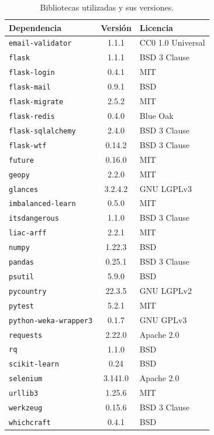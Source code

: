 \begin{table}[]
\centering
\begin{tabular}{lcl}
	\toprule
	\textbf{Dependencia} & \textbf{Versión} & \textbf{Licencia}\\
	\midrule
	\rowcolor[HTML]{EFEFEF} 
	\texttt{email-validator} & 1.1.1 & CC0 1.0 Universal\\
	\texttt{flask} & 1.1.1 & BSD 3 Clause\\ \rowcolor[HTML]{EFEFEF}
	\texttt{flask-login} & 0.4.1 & MIT\\
	\texttt{flask-mail} & 0.9.1 & BSD\\ \rowcolor[HTML]{EFEFEF}
	\texttt{flask-migrate} & 2.5.2 & MIT\\
	\texttt{flask-redis} & 0.4.0 & Blue Oak\\ \rowcolor[HTML]{EFEFEF}
	\texttt{flask-sqlalchemy} & 2.4.0 & BSD 3 Clause\\
	\texttt{flask-wtf} & 0.14.2 & BSD 3 Clause\\ \rowcolor[HTML]{EFEFEF}
	\texttt{future} & 0.16.0 & MIT\\ 
	\texttt{geopy} & 2.2.0 & MIT\\ \rowcolor[HTML]{EFEFEF}
	\texttt{glances} & 3.2.4.2 & GNU LGPLv3\\ 
	\texttt{imbalanced-learn} & 0.5.0 & MIT\\ \rowcolor[HTML]{EFEFEF}
	\texttt{itsdangerous} & 1.1.0 & BSD 3 Clause\\
	\texttt{liac-arff} & 2.2.1 & MIT \\ \rowcolor[HTML]{EFEFEF}
	\texttt{numpy} & 1.22.3 &BSD\\
	\texttt{pandas} & 0.25.1 & BSD 3 Clause\\ \rowcolor[HTML]{EFEFEF}
	\texttt{psutil} & 5.9.0 & BSD\\
	\texttt{pycountry} & 22.3.5 & GNU LGPLv2\\ \rowcolor[HTML]{EFEFEF}
	\texttt{pytest} & 5.2.1 & MIT\\
	\texttt{python-weka-wrapper3} & 0.1.7 & GNU GPLv3\\ \rowcolor[HTML]{EFEFEF}
	\texttt{requests} & 2.22.0 & Apache 2.0\\
	\texttt{rq} & 1.1.0 & BSD \\ \rowcolor[HTML]{EFEFEF}
	\texttt{scikit-learn} & 0.24 & BSD\\ 
	\texttt{selenium} & 3.141.0 & Apache 2.0\\ \rowcolor[HTML]{EFEFEF}
	\texttt{urllib3} & 1.25.6 & MIT\\
	\texttt{werkzeug} & 0.15.6 & BSD 3 Clause\\ \rowcolor[HTML]{EFEFEF}
	\texttt{whichcraft} & 0.4.1 & BSD \\
	\bottomrule
\end{tabular}
\caption{Bibliotecas utilizadas y sus versiones.}\label{tab:dependencias-ubumlaas}
\end{table}


